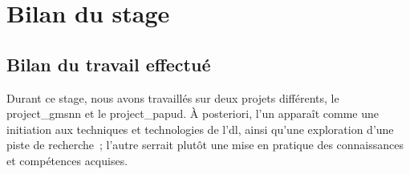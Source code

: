 






\chapter{Bilan du stage}
\section{Bilan du travail effectué}
Durant ce stage, nous avons travaillés sur deux projets différents, le \gls{project_gmsnn} et le \gls{project_papud}.
À posteriori, l'un apparaît comme une initiation aux techniques et technologies de l'\gls{dl}, ainsi qu'une exploration d'une piste de recherche~; l'autre serrait plutôt une mise en pratique des connaissances et compétences acquises.

